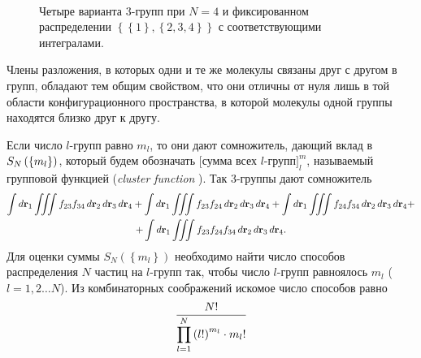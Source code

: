 \begin{figure}[h]
\begin{minipage}{0.33\linewidth}
		\caption*{$\displaystyle \int d \mathbf{r}_1 \iiint f_{24} f_{34} \, d \mathbf{r}_2 \, d \mathbf{r}_3 \, d \mathbf{r}_4$}
	\end{minipage} \\
	\begin{center}
	\begin{minipage}{0.33\linewidth}
		\caption*{$\displaystyle \int d \mathbf{r}_1 \iiint f_{23} f_{24} f_{34} \, d \mathbf{r}_2 \, d \mathbf{r}_3 \, d \mathbf{r}_4$}
	\end{minipage}
\end{center}
\caption{Четыре варианта $3$-групп при $N = 4$ и фиксированном распределении $ \left\{ \left\{ 1 \right\}, \left\{ 2, 3, 4 \right\} \right\}$ с соответствующими интегралами.}
\label{pic:graphs}
\end{figure}

Члены разложения, в которых одни и те же молекулы связаны друг с другом в групп, обладают тем общим свойством, что они отличны от нуля лишь в той области конфигурационного пространства, в которой молекулы одной группы находятся близко друг к другу.

Если число $l$-групп равно $m_l$, то они дают сомножитель, дающий вклад в $S_N \left( \left\{ m_l \right\} \right)$, который будем обозначать $\bigg[ \text{сумма всех $l$-групп} \bigg]^m_l$, называемый групповой функцией (\textit{cluster function} \cite{mayer}). Так 3-группы дают сомножитель
\vverh
\begin{gather}
\int d \mathbf{r}_1 \iiint f_{23} f_{34} \, d \mathbf{r}_2 \, d \mathbf{r}_3 \, d \mathbf{r}_4 + \int d \mathbf{r}_1 \iiint f_{23} f_{24} \, d \mathbf{r}_2 \, d \mathbf{r}_3 \, d \mathbf{r}_4 + \int d \mathbf{r}_1 \iiint f_{24} f_{34} \, d \mathbf{r}_2 \, d \mathbf{r}_3 \, d \mathbf{r}_4 + \notag \\ + \int d \mathbf{r}_1 \iiint f_{23} f_{24} f_{34} \, d \mathbf{r}_2 \, d \mathbf{r}_3 \, d \mathbf{r}_4. \notag
\end{gather}
Для оценки суммы $S_N \left( \left\{ m_l \right\} \right)$ необходимо найти число способов распределения $N$ частиц на $l$-групп так, чтобы число $l$-групп равноялось $m_l$ ($l = 1, 2 \dots N$). Из комбинаторных соображений искомое число способов равно
\vverh
\begin{gather}
	\dfrac{N!}{\displaystyle\prod_{l=1}^{N} \left( l! \right)^{m_l} \cdot m_l !} \notag 
\end{gather}

